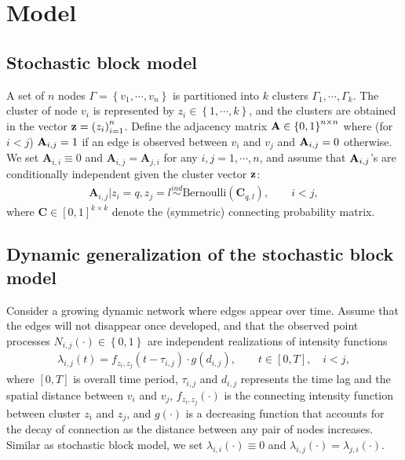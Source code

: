 
\section{Model} %


\subsection{Stochastic block model}
A set of $n$ nodes $\Gamma=\left\{ v_1,\cdots,v_n \right\}$ is partitioned into $k$ clusters $\Gamma_1,\cdots,\Gamma_k$. The cluster of node $v_i$ is represented by $z_i\in \left\{ 1,\cdots,k \right\}$, and the clusters are obtained in the vector $\mathbf{z}=\left( z_i \right)_{i=1}^n $. 
Define the adjacency matrix $\mathbf{A}\in \left\{ 0,1\right\}^{n\times n}$ where (for $i<j$) $\mathbf{A}_{i,j}= 1$ if an edge is observed between $v_i$ and $v_j$ and $\mathbf{A}_{i,j}=0$ otherwise.
We set $\mathbf{A}_{i,i}\equiv 0$ and $\mathbf{A}_{i,j}=\mathbf{A}_{j,i}$ for any $i,j=1,\cdots,n$, 
and assume that $\mathbf{A}_{i,j}$'s are conditionally independent given the cluster vector $\mathbf{z}$:
\begin{align*}
\mathbf{A}_{i,j}|z_i=q,z_j=l \overset{ind}{\sim} \text{Bernoulli}(\mathbf{C}_{q,l}), \qquad i< j,
\end{align*}
where $\mathbf{C}\in [0,1]^{k\times k}$ denote the (symmetric) connecting probability matrix.



\subsection{Dynamic generalization of the stochastic block model}
Consider a growing dynamic network where edges appear over time. 
Assume that the edges will not disappear once developed,
and that the observed point processes ${N}_{i,j}(\cdot)\in \left\{ 0,1 \right\}$ are independent realizations of intensity functions 
\begin{align*}
\lambda_{i,j}(t)=f_{z_i,z_j}(t-\tau_{i,j})\cdot g(d_{i,j}), \qquad t\in[0,T],\quad i<j, 
\end{align*}
where $[0,T]$ is overall time period, $\tau_{i,j}$ and $d_{i,j}$ represents the time lag and the spatial distance between $v_i$ and $v_j$, $f_{z_i,z_j}(\cdot)$ is the connecting intensity function between cluster $z_i$ and $z_j$, and $g(\cdot)$ is a decreasing function that accounts for the decay of connection as the distance between any pair of nodes increases.
Similar as stochastic block model, we set $\lambda_{i,i}(\cdot)\equiv 0$ and $\lambda_{i,j}(\cdot)=\lambda_{j,i}(\cdot)$.

